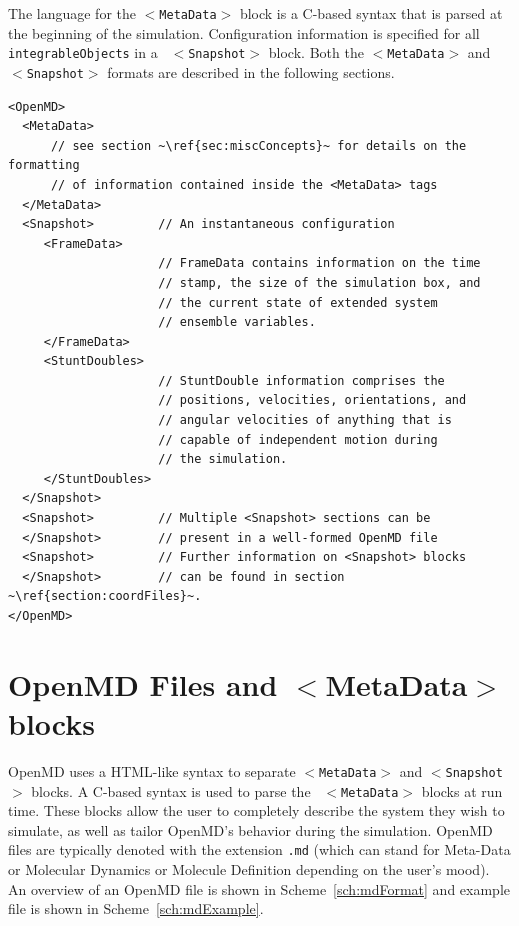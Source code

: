 \documentclass[]{book}
\begin{document}
The language for the {\tt $<$MetaData$>$} block is a C-based syntax that
is parsed at the beginning of the simulation.  Configuration
information is specified for all {\tt integrableObjects} in a {\tt
$<$Snapshot$>$} block.  Both the {\tt $<$MetaData$>$} and {\tt $<$Snapshot$>$}
formats are described in the following sections.

\begin{lstlisting}[float,caption={[The structure of an {\sc OpenMD} file]
The basic structure of an {\sc OpenMD} file contains HTML-like tags to
define simulation meta-data and subsequent instantaneous configuration
information. A well-formed {\sc OpenMD} file must contain one $<$MetaData$>$ 
block and {\it at least one} $<$Snapshot$>$ block.  Each
$<$Snapshot$>$ is further divided into $<$FrameData$>$ and 
$<$StuntDoubles$>$ sections.},
label=sch:mdFormat]
<OpenMD>
  <MetaData>
      // see section ~\ref{sec:miscConcepts}~ for details on the formatting
      // of information contained inside the <MetaData> tags
  </MetaData>
  <Snapshot>         // An instantaneous configuration
     <FrameData>
                     // FrameData contains information on the time
                     // stamp, the size of the simulation box, and 
                     // the current state of extended system 
                     // ensemble variables.
     </FrameData>
     <StuntDoubles>
                     // StuntDouble information comprises the 
                     // positions, velocities, orientations, and 
                     // angular velocities of anything that is 
                     // capable of independent motion during 
                     // the simulation.
     </StuntDoubles>
  </Snapshot>       
  <Snapshot>         // Multiple <Snapshot> sections can be
  </Snapshot>        // present in a well-formed OpenMD file
  <Snapshot>         // Further information on <Snapshot> blocks
  </Snapshot>        // can be found in section ~\ref{section:coordFiles}~.
</OpenMD>
\end{lstlisting}


\section{OpenMD Files and $<$MetaData$>$ blocks}

{\sc OpenMD} uses a HTML-like syntax to separate {\tt $<$MetaData$>$} and
{\tt $<$Snapshot$>$} blocks.  A C-based syntax is used to parse the {\tt
$<$MetaData$>$} blocks at run time.  These blocks allow the user to
completely describe the system they wish to simulate, as well as
tailor {\sc OpenMD}'s behavior during the simulation.  {\sc OpenMD}
files are typically denoted with the extension {\tt .md} (which can
stand for Meta-Data or Molecular Dynamics or Molecule Definition
depending on the user's mood). An overview of an {\sc OpenMD} file is
shown in Scheme~\ref{sch:mdFormat} and example file is shown in
Scheme~\ref{sch:mdExample}.
\end{document}
